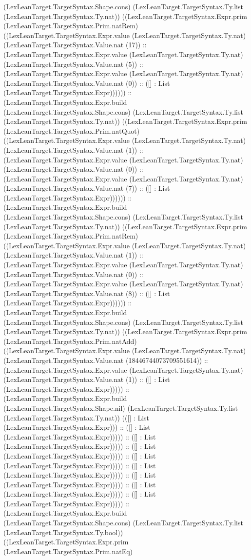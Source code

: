 \documentclass[11pt]{article}
\begin{document}
(LexLeanTarget.TargetSyntax.Shape.cons) (LexLeanTarget.TargetSyntax.Ty.list (LexLeanTarget.TargetSyntax.Ty.nat)) ((LexLeanTarget.TargetSyntax.Expr.prim (LexLeanTarget.TargetSyntax.Prim.natRem) ((LexLeanTarget.TargetSyntax.Expr.value (LexLeanTarget.TargetSyntax.Ty.nat) (LexLeanTarget.TargetSyntax.Value.nat (17)) :: (LexLeanTarget.TargetSyntax.Expr.value (LexLeanTarget.TargetSyntax.Ty.nat) (LexLeanTarget.TargetSyntax.Value.nat (5)) :: (LexLeanTarget.TargetSyntax.Expr.value (LexLeanTarget.TargetSyntax.Ty.nat) (LexLeanTarget.TargetSyntax.Value.nat (0)) :: ([] : List (LexLeanTarget.TargetSyntax.Expr)))))) :: (LexLeanTarget.TargetSyntax.Expr.build (LexLeanTarget.TargetSyntax.Shape.cons) (LexLeanTarget.TargetSyntax.Ty.list (LexLeanTarget.TargetSyntax.Ty.nat)) ((LexLeanTarget.TargetSyntax.Expr.prim (LexLeanTarget.TargetSyntax.Prim.natQuot) ((LexLeanTarget.TargetSyntax.Expr.value (LexLeanTarget.TargetSyntax.Ty.nat) (LexLeanTarget.TargetSyntax.Value.nat (1)) :: (LexLeanTarget.TargetSyntax.Expr.value (LexLeanTarget.TargetSyntax.Ty.nat) (LexLeanTarget.TargetSyntax.Value.nat (0)) :: (LexLeanTarget.TargetSyntax.Expr.value (LexLeanTarget.TargetSyntax.Ty.nat) (LexLeanTarget.TargetSyntax.Value.nat (7)) :: ([] : List (LexLeanTarget.TargetSyntax.Expr)))))) :: (LexLeanTarget.TargetSyntax.Expr.build (LexLeanTarget.TargetSyntax.Shape.cons) (LexLeanTarget.TargetSyntax.Ty.list (LexLeanTarget.TargetSyntax.Ty.nat)) ((LexLeanTarget.TargetSyntax.Expr.prim (LexLeanTarget.TargetSyntax.Prim.natRem) ((LexLeanTarget.TargetSyntax.Expr.value (LexLeanTarget.TargetSyntax.Ty.nat) (LexLeanTarget.TargetSyntax.Value.nat (1)) :: (LexLeanTarget.TargetSyntax.Expr.value (LexLeanTarget.TargetSyntax.Ty.nat) (LexLeanTarget.TargetSyntax.Value.nat (0)) :: (LexLeanTarget.TargetSyntax.Expr.value (LexLeanTarget.TargetSyntax.Ty.nat) (LexLeanTarget.TargetSyntax.Value.nat (8)) :: ([] : List (LexLeanTarget.TargetSyntax.Expr)))))) :: (LexLeanTarget.TargetSyntax.Expr.build (LexLeanTarget.TargetSyntax.Shape.cons) (LexLeanTarget.TargetSyntax.Ty.list (LexLeanTarget.TargetSyntax.Ty.nat)) ((LexLeanTarget.TargetSyntax.Expr.prim (LexLeanTarget.TargetSyntax.Prim.natAdd) ((LexLeanTarget.TargetSyntax.Expr.value (LexLeanTarget.TargetSyntax.Ty.nat) (LexLeanTarget.TargetSyntax.Value.nat (18446744073709551614)) :: (LexLeanTarget.TargetSyntax.Expr.value (LexLeanTarget.TargetSyntax.Ty.nat) (LexLeanTarget.TargetSyntax.Value.nat (1)) :: ([] : List (LexLeanTarget.TargetSyntax.Expr))))) :: (LexLeanTarget.TargetSyntax.Expr.build (LexLeanTarget.TargetSyntax.Shape.nil) (LexLeanTarget.TargetSyntax.Ty.list (LexLeanTarget.TargetSyntax.Ty.nat)) (([] : List (LexLeanTarget.TargetSyntax.Expr))) :: ([] : List (LexLeanTarget.TargetSyntax.Expr))))) :: ([] : List (LexLeanTarget.TargetSyntax.Expr))))) :: ([] : List (LexLeanTarget.TargetSyntax.Expr))))) :: ([] : List (LexLeanTarget.TargetSyntax.Expr))))) :: ([] : List (LexLeanTarget.TargetSyntax.Expr))))) :: ([] : List (LexLeanTarget.TargetSyntax.Expr))))) :: ([] : List (LexLeanTarget.TargetSyntax.Expr))))) :: ([] : List (LexLeanTarget.TargetSyntax.Expr))))) :: (LexLeanTarget.TargetSyntax.Expr.build (LexLeanTarget.TargetSyntax.Shape.cons) (LexLeanTarget.TargetSyntax.Ty.list (LexLeanTarget.TargetSyntax.Ty.bool)) ((LexLeanTarget.TargetSyntax.Expr.prim (LexLeanTarget.TargetSyntax.Prim.natEq) 
\end{document}
